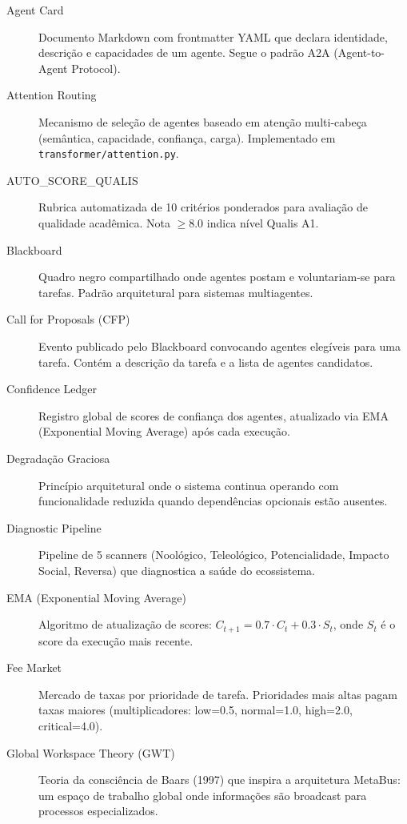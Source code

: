 \begin{description}
  \item[Agent Card] Documento Markdown com frontmatter YAML que declara identidade, descrição e capacidades de um agente. Segue o padrão A2A (Agent-to-Agent Protocol).
  
  \item[Attention Routing] Mecanismo de seleção de agentes baseado em atenção multi-cabeça (semântica, capacidade, confiança, carga). Implementado em \texttt{transformer/attention.py}.
  
  \item[AUTO\_SCORE\_QUALIS] Rubrica automatizada de 10 critérios ponderados para avaliação de qualidade acadêmica. Nota $\ge 8.0$ indica nível Qualis A1.
  
  \item[Blackboard] Quadro negro compartilhado onde agentes postam e voluntariam-se para tarefas. Padrão arquitetural para sistemas multiagentes.
  
  \item[Call for Proposals (CFP)] Evento publicado pelo Blackboard convocando agentes elegíveis para uma tarefa. Contém a descrição da tarefa e a lista de agentes candidatos.
  
  \item[Confidence Ledger] Registro global de scores de confiança dos agentes, atualizado via EMA (Exponential Moving Average) após cada execução.
  
  \item[Degradação Graciosa] Princípio arquitetural onde o sistema continua operando com funcionalidade reduzida quando dependências opcionais estão ausentes.
  
  \item[Diagnostic Pipeline] Pipeline de 5 scanners (Noológico, Teleológico, Potencialidade, Impacto Social, Reversa) que diagnostica a saúde do ecossistema.
  
  \item[EMA (Exponential Moving Average)] Algoritmo de atualização de scores: $C_{t+1} = 0.7 \cdot C_t + 0.3 \cdot S_t$, onde $S_t$ é o score da execução mais recente.
  
  \item[Fee Market] Mercado de taxas por prioridade de tarefa. Prioridades mais altas pagam taxas maiores (multiplicadores: low=0.5, normal=1.0, high=2.0, critical=4.0).
  
  \item[Global Workspace Theory (GWT)] Teoria da consciência de Baars (1997) que inspira a arquitetura MetaBus: um espaço de trabalho global onde informações são broadcast para processos especializados.
  

\end{description}
